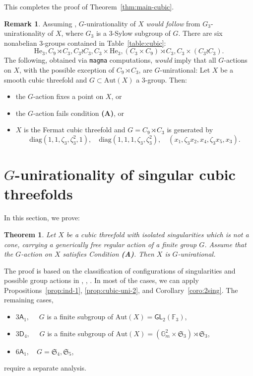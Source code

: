 \documentclass[12pt,reqno]{amsart}
\theoremstyle{plain}
\newtheorem{theo}[prop]{Theorem}
\theoremstyle{remark}
\theoremstyle{definition}
\newtheorem{rema}[prop]{Remark}
\numberwithin{equation}{section}
\def\sA{{\mathsf A}}
\def\sD{{\mathsf D}}
\def\fS{{\mathfrak S}}
\def\fS{{\mathfrak S}}
\def\bG{{\mathbb G}}
\def\bF{{\mathbb F}}
\def\Aut{\mathrm{Aut}}
\def\GL{\mathsf{GL}}
\begin{document}
This completes the proof of Theorem~\ref{thm:main-cubic}.
\begin{rema} 
Assuming \cite[Conjecture 10.4 and Theorem 10.5]{DR}, $G$-unirationality of $X$ {\em would follow} from $G_3$-unirationality of $X$, where $G_3$ is a 3-Sylow subgroup of $G$. 
There are six nonabelian 3-groups contained in Table~\ref{table:cubic}: 
$$
\mathrm{He}_3, C_9\rtimes C_3, C_3\wr C_3, C_3\times\mathrm{He}_3, (C_3\times C_9)\rtimes C_3, C_3\times(C_3\wr C_3).
$$ 
The following, obtained via {\tt magma} computations,  {\em would} imply that all $G$-actions on $X$, with the possible exception of $C_9\rtimes C_3$, are $G$-unirational:
Let $X$ be a smooth cubic threefold and $G\subset\Aut(X)$ a 3-group. Then: 
\begin{itemize}
    \item the $G$-action fixes a point on $X$, or
    \item the $G$-action fails condition {\bf (A)}, or
    \item $X$ is the Fermat cubic threefold and $G=C_9\rtimes C_3$ is generated by 
    $$
    \mathrm{diag}(1,1,\zeta_3,\zeta_3^2,1),  \quad  \mathrm{diag}(1,1,1,\zeta_3,\zeta_3^2), \quad(x_1,\zeta_3x_2,x_4,\zeta_3x_5,x_3).
    $$
\end{itemize}

\end{rema}

\section{$G$-unirationality of singular cubic threefolds}
\label{sect:sing}

In this section, we prove: 

\begin{theo}\label{thm:singcub-main}
    Let $X$ be a cubic threefold with isolated singularities which is not a cone, carrying a generically free regular action of a finite group $G$. Assume that the $G$-action on $X$ satisfies Condition {\bf (A)}. Then $X$ is $G$-unirational.
\end{theo}

The proof is based on the classification of configurations of singularities and possible group actions in \cite{CTZ-burk}, \cite{CTZ-cubic}, \cite{CMTZ}. In most of the cases, we can apply Propositions~\ref{prop:ind-1}, \ref{prop:cubic-uni-2}, and Corollary~\ref{coro:2sing}. The remaining cases, 
\begin{itemize}
    \item $3\sA_1,\quad$ $G$ is a finite subgroup of $\Aut(X)=\GL_2(\bF_3)$,
    \item $3\sD_4,\quad$  $G$ is a finite subgroup of $\Aut(X)=(\bG_m^2\times \fS_3)\rtimes\fS_3$, 
\item $6\sA_1,\quad G=\fS_4, \fS_5$,
\end{itemize}
require a separate analysis. 
\end{document}
